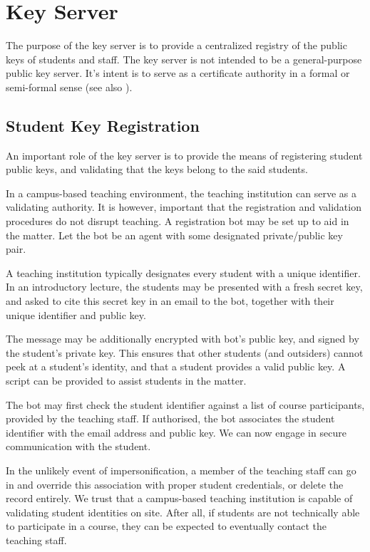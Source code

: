 
\section{Key Server}

The purpose of the key server is to provide a centralized registry of the
public keys of students and staff. The key server is not intended to be a
general-purpose public key server. It's intent is to serve as a certificate
authority in a formal or semi-formal sense (see also
).

\subsection{Student Key Registration}

An important role of the key server is to provide the means of registering
student public keys, and validating that the keys belong to the said students.

In a campus-based teaching environment, the teaching institution can serve as a
validating authority. It is however, important that the registration and
validation procedures do not disrupt teaching. A registration bot may be set up
to aid in the matter. Let the bot be an agent with some designated
private/public key pair.

A teaching institution typically designates every student with a unique
identifier. In an introductory lecture, the students may be presented with a
fresh secret key, and asked to cite this secret key in an email to the bot,
together with their unique identifier and public key.

The message may be additionally encrypted with bot's public key, and signed by
the student's private key.  This ensures that other students (and outsiders)
cannot peek at a student's identity, and that a student provides a valid public
key. A script can be provided to assist students in the matter.

The bot may first check the student identifier against a list of course
participants, provided by the teaching staff. If authorised, the bot associates
the student identifier with the email address and public key. We can now engage
in secure communication with the student.

In the unlikely event of impersonification, a member of the teaching staff can
go in and override this association with proper student credentials, or delete
the record entirely. We trust that a campus-based teaching institution is
capable of validating student identities on site. After all, if students are
not technically able to participate in a course, they can be expected to
eventually contact the teaching staff.

